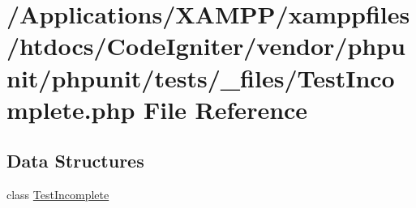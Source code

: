 \hypertarget{_test_incomplete_8php}{}\section{/\+Applications/\+X\+A\+M\+P\+P/xamppfiles/htdocs/\+Code\+Igniter/vendor/phpunit/phpunit/tests/\+\_\+files/\+Test\+Incomplete.php File Reference}
\label{_test_incomplete_8php}
\subsection*{Data Structures}
\begin{DoxyCompactItemize}
\item 
class \mbox{\hyperlink{class_test_incomplete}{Test\+Incomplete}}
\end{DoxyCompactItemize}
